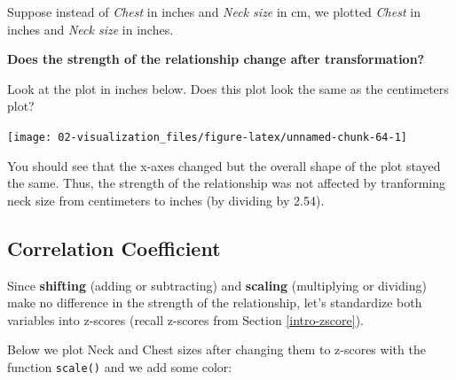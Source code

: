 \documentclass[
]{book}
\newenvironment{Shaded}{\begin{snugshade}}{\end{snugshade}}
\newcommand{\DataTypeTok}[1]{\textcolor[rgb]{0.13,0.29,0.53}{#1}}
\newcommand{\FloatTok}[1]{\textcolor[rgb]{0.00,0.00,0.81}{#1}}
\newcommand{\KeywordTok}[1]{\textcolor[rgb]{0.13,0.29,0.53}{\textbf{#1}}}
\newcommand{\NormalTok}[1]{#1}
\newcommand{\OperatorTok}[1]{\textcolor[rgb]{0.81,0.36,0.00}{\textbf{#1}}}
\newcommand{\StringTok}[1]{\textcolor[rgb]{0.31,0.60,0.02}{#1}}
\begin{document}
Suppose instead of \emph{Chest} in inches and \emph{Neck size} in cm, we plotted \emph{Chest} in inches and \emph{Neck size} in inches.

\textbf{Does the strength of the relationship change after transformation?}

Look at the plot in inches below. Does this plot look the same as the centimeters plot?

\begin{Shaded}
\end{Shaded}

\begin{center}\texttt{[image: 02-visualization\_files/figure-latex/unnamed-chunk-64-1]} \end{center}

You should see that the x-axes changed but the overall shape of the plot stayed the same. Thus, the strength of the relationship was not affected by tranforming neck size from centimeters to inches (by dividing by 2.54).

\hypertarget{correlation-coefficient}{%
\subsection{Correlation Coefficient}\label{correlation-coefficient}}

Since \textbf{shifting} (adding or subtracting) and \textbf{scaling} (multiplying or dividing) make no difference in the strength of the relationship, let's standardize both variables into z-scores (recall z-scores from Section \ref{intro-zscore}).

Below we plot Neck and Chest sizes after changing them to z-scores with the function \texttt{scale()} and we add some color:
\end{document}
